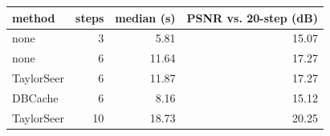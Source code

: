 \begin{tabular}{@{}lrrr@{}}
\toprule
method & steps & median (s) & PSNR vs. 20-step (dB) \\
\midrule
none & 3 & 5.81 & 15.07 \\
none & 6 & 11.64 & 17.27 \\
TaylorSeer & 6 & 11.87 & 17.27 \\
DBCache & 6 & 8.16 & 15.12 \\
TaylorSeer & 10 & 18.73 & 20.25 \\
\bottomrule
\end{tabular}
